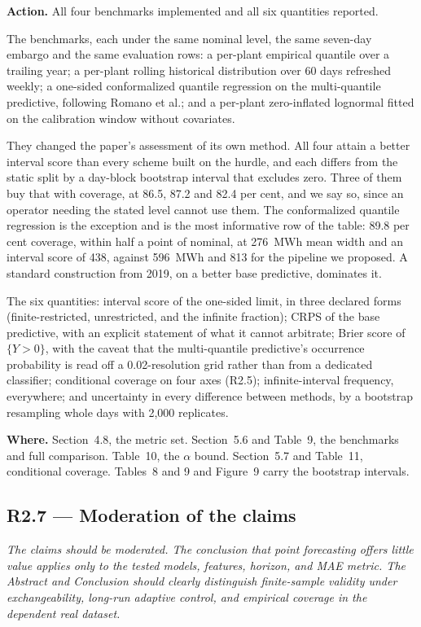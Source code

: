 \documentclass[11pt,a4paper]{article}
\newenvironment{revcomment}
  {\begin{mdframed}[backgroundcolor=quotebg,linecolor=quoterule,linewidth=0.4pt,
    innertopmargin=6pt,innerbottommargin=6pt,skipabove=8pt,skipbelow=8pt]\itshape}
  {\end{mdframed}}
\newcommand{\action}[1]{\textbf{Action.} #1}
\newcommand{\where}[1]{\textbf{Where.} #1}
\begin{document}
\action{All four benchmarks implemented and all six quantities reported.}

The benchmarks, each under the same nominal level, the same seven-day embargo and the same evaluation rows: a per-plant empirical quantile over a trailing year; a per-plant rolling historical distribution over 60 days refreshed weekly; a one-sided conformalized quantile regression on the multi-quantile predictive, following Romano et al.; and a per-plant zero-inflated lognormal fitted on the calibration window without covariates.

They changed the paper's assessment of its own method. All four attain a better interval score than every scheme built on the hurdle, and each differs from the static split by a day-block bootstrap interval that excludes zero. Three of them buy that with coverage, at 86.5, 87.2 and 82.4 per cent, and we say so, since an operator needing the stated level cannot use them. The conformalized quantile regression is the exception and is the most informative row of the table: 89.8 per cent coverage, within half a point of nominal, at 276~MWh mean width and an interval score of 438, against 596~MWh and 813 for the pipeline we proposed. A standard construction from 2019, on a better base predictive, dominates it.

The six quantities: interval score of the one-sided limit, in three declared forms (finite-restricted, unrestricted, and the infinite fraction); CRPS of the base predictive, with an explicit statement of what it cannot arbitrate; Brier score of $\{Y>0\}$, with the caveat that the multi-quantile predictive's occurrence probability is read off a 0.02-resolution grid rather than from a dedicated classifier; conditional coverage on four axes (R2.5); infinite-interval frequency, everywhere; and uncertainty in every difference between methods, by a bootstrap resampling whole days with 2{,}000 replicates.

\where{Section~4.8, the metric set. Section~5.6 and Table~9, the benchmarks and full comparison. Table~10, the $\alpha$ bound. Section~5.7 and Table~11, conditional coverage. Tables~8 and 9 and Figure~9 carry the bootstrap intervals.}

\subsection*{R2.7 --- Moderation of the claims}

\begin{revcomment}
The claims should be moderated. The conclusion that point forecasting offers little value applies only to the tested models, features, horizon, and MAE metric. The Abstract and Conclusion should clearly distinguish finite-sample validity under exchangeability, long-run adaptive control, and empirical coverage in the dependent real dataset.
\end{revcomment}
\end{document}
